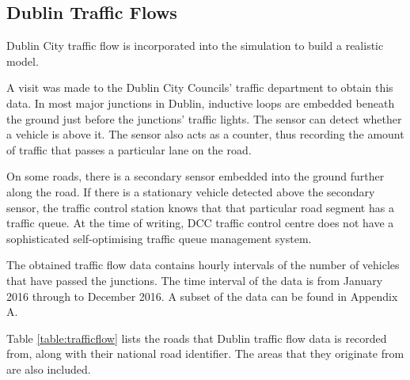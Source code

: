 \pagebreak

\subsection{Dublin Traffic Flows} \label{ssec:traffic_flows}
Dublin City traffic flow is incorporated into the simulation to build a realistic model.

A visit was made to the Dublin City Councils' traffic department to obtain this data. In most major junctions in Dublin, inductive loops are embedded beneath the ground just before the junctions' traffic lights. The sensor can detect whether a vehicle is above it. The sensor also acts as a counter, thus recording the amount of traffic that passes a particular lane on the road. 

On some roads, there is a secondary sensor embedded into the ground further along the road. If there is a stationary vehicle detected above the secondary sensor, the traffic control station knows that that particular road segment has a traffic queue. At the time of writing, \ac{DCC} traffic control centre does not have a sophisticated self-optimising traffic queue management system.

The obtained traffic flow data contains hourly intervals of the number of vehicles that have passed the junctions. The time interval of the data is from January 2016 through to December 2016. A subset of the data can be found in Appendix A.

Table \ref{table:trafficflow} lists the roads that Dublin traffic flow data is recorded from, along with their national road identifier. The areas that they originate from are also included.

